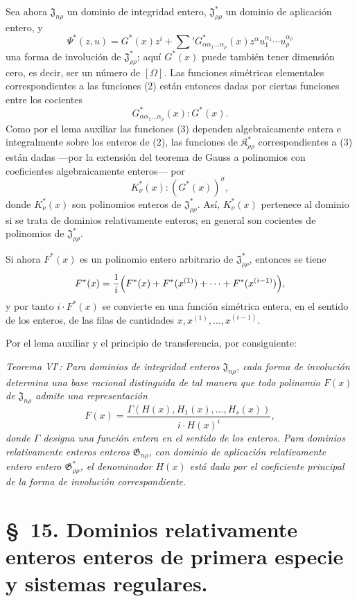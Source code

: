 \documentclass[11pt]{article}
\providecommand{\Kfield}{\mathfrak{K}}
\providecommand{\Jdom}{\mathfrak{J}}
\providecommand{\Gdom}{\mathfrak{G}}
\begin{document}
Sea ahora $\Jdom_{n\rho}$ un dominio de integridad entero, $\Jdom^*_{\rho\rho}$ un dominio de aplicación entero, y
\[
  \Psi^*(z,u)=G^*(x)z^i+
  \sum{}'G^*_{\alpha\alpha_1\ldots\alpha_\rho}(x)
  z^\alpha u_1^{\alpha_1}\cdots u_\rho^{\alpha_\rho}
\]
una forma de involución de $\Jdom^*_{\rho\rho}$; aquí $G^*(x)$ puede también tener dimensión cero, es decir, ser un número de $[\Omega]$. Las funciones simétricas elementales correspondientes a las funciones (2) están entonces dadas por ciertas funciones entre los cocientes
\begin{equation}
  G^*_{\alpha\alpha_1\ldots\alpha_\rho}(x):G^*(x).
\tag{4}
\end{equation}
Como por el lema auxiliar las funciones (3) dependen algebraicamente entera e integralmente sobre los enteros de (2), las funciones de $\Kfield^*_{\rho\rho}$ correspondientes a (3) están dadas ---por la extensión del teorema de Gauss a polinomios con coeficientes algebraicamente enteros--- por
\begin{equation}
  K_\nu^*(x):(G^*(x))^\sigma,
\tag{5}
\end{equation}
donde $K_\nu^*(x)$ son polinomios enteros de $\Jdom^*_{\rho\rho}$. Así, $K_\nu^*(x)$ pertenece al dominio si se trata de dominios relativamente enteros; en general son cocientes de polinomios de $\Jdom^*_{\rho\rho}$.

Si ahora $F^*(x)$ es un polinomio entero arbitrario de $\Jdom^*_{\rho\rho}$, entonces se tiene
\[
  F^*(x)=\frac1i\Bigl(F^*(x)+F^*(x^{(1)})+\cdots+F^*(x^{(i-1)})\Bigr),
\]
y por tanto $i\cdot F^*(x)$ se convierte en una función simétrica entera, en el sentido de los enteros, de las filas de cantidades $x,x^{(1)},\ldots,x^{(i-1)}$.

Por el lema auxiliar y el principio de transferencia, por consiguiente:

\emph{Teorema VI$'$: Para dominios de integridad enteros $\Jdom_{n\rho}$, cada forma de involución determina una base racional distinguida de tal manera que todo polinomio $F(x)$ de $\Jdom_{n\rho}$ admite una representación}
\[
  F(x)=\frac{\Gamma(H(x),H_1(x),\ldots,H_s(x))}{i\cdot H(x)^i},
\]
\emph{donde $\Gamma$ designa una función entera en el sentido de los enteros. Para dominios relativamente enteros enteros $\Gdom_{n\rho}$, con dominio de aplicación relativamente entero entero $\Gdom^*_{\rho\rho}$, el denominador $H(x)$ está dado por el coeficiente principal de la forma de involución correspondiente.}

\section*{\S\ 15. Dominios relativamente enteros enteros de primera especie y sistemas regulares.}
\end{document}
